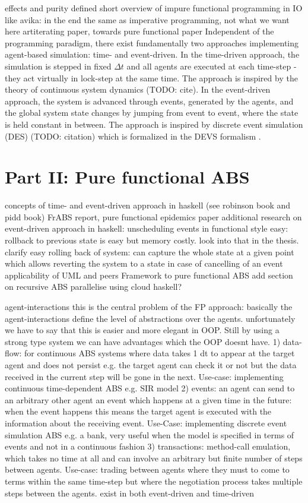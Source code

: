 \documentclass[oneside]{book}
\begin{document}
effects and purity defined
short overview of impure functional programming in IO like avika: in the end the same as imperative programming, not what we want here
artiterating paper,
towards pure functional paper
Independent of the programming paradigm, there exist fundamentally two approaches implementing agent-based simulation: time- and event-driven. In the time-driven approach, the simulation is stepped in fixed $\Delta t$ and all agents are executed at each time-step - they act virtually in lock-step at the same time. The approach is inspired by the theory of continuous system dynamics (TODO: cite).
In the event-driven approach, the system is advanced through events, generated by the agents, and the global system state changes by jumping from event to event, where the state is held constant in between. The approach is inspired by discrete event simulation (DES) (TODO: citation) which is formalized in the DEVS formalism \cite{zeigler_theory_2000}.


\chapter{Part II: Pure functional ABS}
concepts of time- and event-driven approach in haskell (see robinson book and pidd book)
FrABS report,
pure functional epidemics paper
additional research on event-driven approach in haskell: unscheduling events in functional style easy: rollback to previous state is easy but memory costly. look into that in the thesis. clarify easy rolling back of system: can capture the whole state at a given point which allows reverting the system to a state in case of cancelling of an event
applicability of UML and peers Framework to pure functional ABS 
add section on recursive ABS
parallelise using cloud haskell?

agent-interactions
this is the central problem of the FP approach: basically the agent-interactions define the level of abstractions over the agents. unfortunately we have to say that this is easier and more elegant in OOP. Still by using a strong type system we can have advantages which the OOP doesnt have.
1) data-flow: for continuous ABS systems where data takes 1 dt to appear at the target agent and does not persist e.g. the target agent can check it or not but the data received in the current step will be gone in the next. Use-case: implementing continuous time-dependent ABS e.g. SIR model
2) events: an agent can send to an arbitrary other agent an event which happens at a given time in the future: when the event happens this means the target agent is executed with the information about the receiving event. Use-Case: implementing discrete event simulation ABS e.g. a bank, very useful when the model is specified in terms of events and not in a continuous fashion
3) transactions: method-call emulation, which takes no time at all and can involve an arbitrary but finite number of steps between agents. Use-case: trading between agents where they must to come to terms within the same time-step but where the negotiation process takes multiple steps between the agents. exist in both event-driven and time-driven
\end{document}
